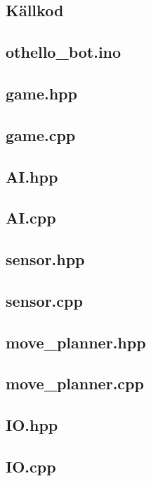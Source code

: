 \documentclass[a4paper]{article}
\begin{document}
\pagebreak
\begin{appendix}
\section{Källkod} \label{code}
\subsection{othello\_bot.ino}

\subsection{game.hpp}

\subsection{game.cpp}

\subsection{AI.hpp}

\subsection{AI.cpp}

\subsection{sensor.hpp}

\subsection{sensor.cpp}

\subsection{move\_planner.hpp}

\subsection{move\_planner.cpp}

\subsection{IO.hpp}

\subsection{IO.cpp}


\end{appendix}
\end{document}
